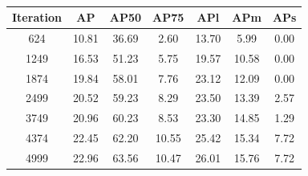 \documentclass[a4paper,12pt]{report}
\newcommand{\en}{\selectlanguage{english}}
\begin{document}
\paragraph{}
\begin{center}
	\begin{tabular}{|c|c|c|c|c|c|c|}
		\hline
		\cellcolor[HTML]{CCE5E5} \en \textbf{Iteration} &
		\cellcolor[HTML]{CCE5E5} \en \textbf{AP} &
		\cellcolor[HTML]{CCE5E5} \en \textbf{AP50} &
		\cellcolor[HTML]{CCE5E5} \en \textbf{AP75} &
		\cellcolor[HTML]{CCE5E5} \en \textbf{APl} &
		\cellcolor[HTML]{CCE5E5} \en \textbf{APm} &
		\cellcolor[HTML]{CCE5E5} \en \textbf{APs} \\
		\hline
		\cellcolor[HTML]{FFE0CC} 624 & \cellcolor[HTML]{E6F2E6} 10.81 & \cellcolor[HTML]{E6F2E6} 36.69 & \cellcolor[HTML]{E6F2E6} 2.60 & \cellcolor[HTML]{E6F2E6} 13.70 & \cellcolor[HTML]{E6F2E6} 5.99 & \cellcolor[HTML]{FFE0CC} 0.00 \\
		\hline
		\cellcolor[HTML]{FFE0CC} 1249 & \cellcolor[HTML]{E6F2E6} 16.53 & \cellcolor[HTML]{E6F2E6} 51.23 & \cellcolor[HTML]{E6F2E6} 5.75 & \cellcolor[HTML]{E6F2E6} 19.57 & \cellcolor[HTML]{E6F2E6} 10.58 & \cellcolor[HTML]{FFE0CC} 0.00 \\
		\hline
		\cellcolor[HTML]{FFE0CC} 1874 & \cellcolor[HTML]{E6F2E6} 19.84 & \cellcolor[HTML]{E6F2E6} 58.01 & \cellcolor[HTML]{E6F2E6} 7.76 & \cellcolor[HTML]{E6F2E6} 23.12 & \cellcolor[HTML]{E6F2E6} 12.09 & \cellcolor[HTML]{FFE0CC} 0.00 \\
		\hline
		\cellcolor[HTML]{FFE0CC} 2499 & \cellcolor[HTML]{E6F2E6} 20.52 & \cellcolor[HTML]{E6F2E6} 59.23 & \cellcolor[HTML]{E6F2E6} 8.29 & \cellcolor[HTML]{E6F2E6} 23.50 & \cellcolor[HTML]{E6F2E6} 13.39 & \cellcolor[HTML]{FFE0CC} 2.57 \\
		\hline
		\cellcolor[HTML]{FFE0CC} 3749 & \cellcolor[HTML]{E6F2E6} 20.96 & \cellcolor[HTML]{E6F2E6} 60.23 & \cellcolor[HTML]{E6F2E6} 8.53 & \cellcolor[HTML]{E6F2E6} 23.30 & \cellcolor[HTML]{E6F2E6} 14.85 & \cellcolor[HTML]{FFE0CC} 1.29 \\
		\hline
		\cellcolor[HTML]{FFE0CC} 4374 & \cellcolor[HTML]{E6F2E6} 22.45 & \cellcolor[HTML]{E6F2E6} 62.20 & \cellcolor[HTML]{E6F2E6} 10.55 & \cellcolor[HTML]{E6F2E6} 25.42 & \cellcolor[HTML]{E6F2E6} 15.34 & \cellcolor[HTML]{FFE0CC} 7.72 \\
		\hline
		\cellcolor[HTML]{FFE0CC} 4999 & \cellcolor[HTML]{E6F2E6} 22.96 & \cellcolor[HTML]{E6F2E6} 63.56 & \cellcolor[HTML]{E6F2E6} 10.47 & \cellcolor[HTML]{E6F2E6} 26.01 & \cellcolor[HTML]{E6F2E6} 15.76 & \cellcolor[HTML]{FFE0CC} 7.72 \\

\end{tabular}
\end{center}
\end{document}
